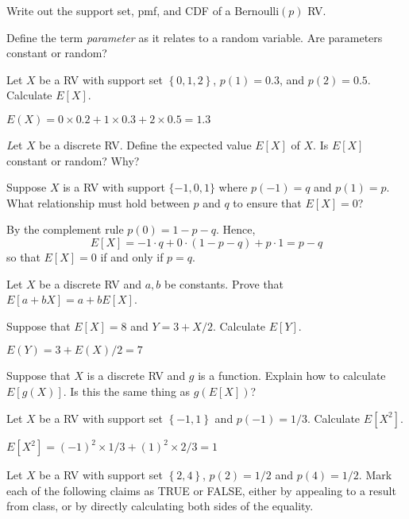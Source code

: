\documentclass[addpoints,12pt]{exam}
\begin{document}
\begin{questions}
\question Write out the support set, pmf, and CDF of a Bernoulli$(p)$ RV.

\question Define the term \emph{parameter} as it relates to a random variable. Are parameters constant or random?

\question Let $X$ be a RV with support set $\left\{0, 1, 2 \right\}$, $p(1) = 0.3$, and $p(2) = 0.5$. Calculate $E[X]$.
\begin{solution}
  $E(X) = 0 \times 0.2 + 1 \times 0.3 + 2 \times 0.5 = 1.3$
\end{solution}


\emph Let $X$ be a discrete RV. Define the expected value $E[X]$ of $X$. Is $E[X]$ constant or random? Why?

\question Suppose $X$ is a RV with support $\{-1, 0, 1\}$ where $p(-1)=q$ and $p(1) = p$. What relationship must hold between $p$ and $q$ to ensure that $E[X] = 0$?
		\begin{solution}
				By the complement rule $p(0) = 1 - p - q$.
        Hence, 
        \[
          E[X] = -1 \cdot q + 0 \cdot (1-p-q) + p\cdot 1 = p-q
        \]
        so that $E[X] = 0$ if and only if $p = q$.
    \end{solution}

\question Let $X$ be a discrete RV and $a, b$ be constants. 
Prove that $E[a + bX] = a + bE[X]$.

\question Suppose that $E[X]=8$ and $Y= 3 + X/2$. Calculate $E[Y]$.
\begin{solution}
$E(Y) = 3 + E(X)/2 = 7$
\end{solution}

\question Suppose that $X$ is a discrete RV and $g$ is a function. Explain how to calculate $E[g(X)]$. Is this the same thing as $g\left(E[X]\right)$?

\question Let $X$ be a RV with support set $\left\{ -1, 1 \right\}$ and $p(-1) = 1/3$. Calculate $E[X^2]$.
\begin{solution}
  $E[X^2] = (-1)^2 \times 1/3 + (1)^2 \times 2/3 = 1$
\end{solution}

\question Let $X$ be a RV with support set $\left\{ 2,4 \right\}$, $p(2) = 1/2$ and $p(4) = 1/2$. Mark each of the following claims as TRUE or FALSE, either by appealing to a result from class, or by directly calculating both sides of the equality.
\end{questions}
\end{document}

